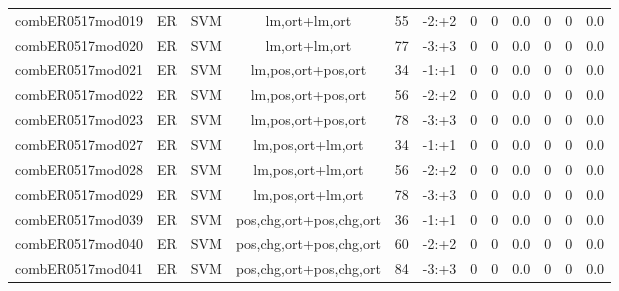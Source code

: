 \documentclass[a4paper]{article}
\begin{document}
\begin{landscape}
\begin{center}
\begin{tabular}{ |c|c|c|c|c|c|c|c|c|c|c|c|}
 
 	
 	\small{ combER0517mod019 } & ER & SVM & lm,ort+lm,ort  &  55 &  -2:+2  &  0 & 0 & 0.0  &  0 & 0 & 0.0 \\
 	

 
 	
 	\small{ combER0517mod020 } & ER & SVM & lm,ort+lm,ort  &  77 &  -3:+3  &  0 & 0 & 0.0  &  0 & 0 & 0.0 \\
 	

 
 	
 	\small{ combER0517mod021 } & ER & SVM & lm,pos,ort+pos,ort  &  34 &  -1:+1  &  0 & 0 & 0.0  &  0 & 0 & 0.0 \\
 	

 
 	
 	\small{ combER0517mod022 } & ER & SVM & lm,pos,ort+pos,ort  &  56 &  -2:+2  &  0 & 0 & 0.0  &  0 & 0 & 0.0 \\
 	

 
 	
 	\small{ combER0517mod023 } & ER & SVM & lm,pos,ort+pos,ort  &  78 &  -3:+3  &  0 & 0 & 0.0  &  0 & 0 & 0.0 \\
 	

 
 	
 	\small{ combER0517mod027 } & ER & SVM & lm,pos,ort+lm,ort  &  34 &  -1:+1  &  0 & 0 & 0.0  &  0 & 0 & 0.0 \\
 	

 
 	
 	\small{ combER0517mod028 } & ER & SVM & lm,pos,ort+lm,ort  &  56 &  -2:+2  &  0 & 0 & 0.0  &  0 & 0 & 0.0 \\
 	

 
 	
 	\small{ combER0517mod029 } & ER & SVM & lm,pos,ort+lm,ort  &  78 &  -3:+3  &  0 & 0 & 0.0  &  0 & 0 & 0.0 \\
 	

 
 	
 	\small{ combER0517mod039 } & ER & SVM & pos,chg,ort+pos,chg,ort  &  36 &  -1:+1  &  0 & 0 & 0.0  &  0 & 0 & 0.0 \\
 	

 
 	
 	\small{ combER0517mod040 } & ER & SVM & pos,chg,ort+pos,chg,ort  &  60 &  -2:+2  &  0 & 0 & 0.0  &  0 & 0 & 0.0 \\
 	

 
 	
 	\small{ combER0517mod041 } & ER & SVM & pos,chg,ort+pos,chg,ort  &  84 &  -3:+3  &  0 & 0 & 0.0  &  0 & 0 & 0.0 \\
 	


\end{tabular}
\end{center}
\end{landscape}
\end{document}
